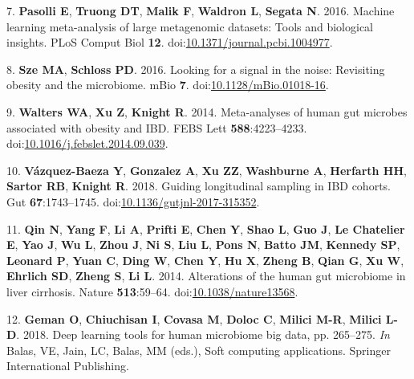 \documentclass[
  11pt,
]{article}
\begin{document}
\leavevmode\hypertarget{ref-pasolli_machine_2016}{}%
7. \textbf{Pasolli E}, \textbf{Truong DT}, \textbf{Malik F},
\textbf{Waldron L}, \textbf{Segata N}. 2016. Machine learning
meta-analysis of large metagenomic datasets: Tools and biological
insights. PLoS Comput Biol \textbf{12}.
doi:\href{https://doi.org/10.1371/journal.pcbi.1004977}{10.1371/journal.pcbi.1004977}.

\leavevmode\hypertarget{ref-sze_looking_2016}{}%
8. \textbf{Sze MA}, \textbf{Schloss PD}. 2016. Looking for a signal in
the noise: Revisiting obesity and the microbiome. mBio \textbf{7}.
doi:\href{https://doi.org/10.1128/mBio.01018-16}{10.1128/mBio.01018-16}.

\leavevmode\hypertarget{ref-walters_meta-analyses_2014}{}%
9. \textbf{Walters WA}, \textbf{Xu Z}, \textbf{Knight R}. 2014.
Meta-analyses of human gut microbes associated with obesity and IBD.
FEBS Lett \textbf{588}:4223--4233.
doi:\href{https://doi.org/10.1016/j.febslet.2014.09.039}{10.1016/j.febslet.2014.09.039}.

\leavevmode\hypertarget{ref-vazquez-baeza_guiding_2018}{}%
10. \textbf{Vázquez-Baeza Y}, \textbf{Gonzalez A}, \textbf{Xu ZZ},
\textbf{Washburne A}, \textbf{Herfarth HH}, \textbf{Sartor RB},
\textbf{Knight R}. 2018. Guiding longitudinal sampling in IBD cohorts.
Gut \textbf{67}:1743--1745.
doi:\href{https://doi.org/10.1136/gutjnl-2017-315352}{10.1136/gutjnl-2017-315352}.

\leavevmode\hypertarget{ref-qin_alterations_2014}{}%
11. \textbf{Qin N}, \textbf{Yang F}, \textbf{Li A}, \textbf{Prifti E},
\textbf{Chen Y}, \textbf{Shao L}, \textbf{Guo J}, \textbf{Le Chatelier
E}, \textbf{Yao J}, \textbf{Wu L}, \textbf{Zhou J}, \textbf{Ni S},
\textbf{Liu L}, \textbf{Pons N}, \textbf{Batto JM}, \textbf{Kennedy SP},
\textbf{Leonard P}, \textbf{Yuan C}, \textbf{Ding W}, \textbf{Chen Y},
\textbf{Hu X}, \textbf{Zheng B}, \textbf{Qian G}, \textbf{Xu W},
\textbf{Ehrlich SD}, \textbf{Zheng S}, \textbf{Li L}. 2014. Alterations
of the human gut microbiome in liver cirrhosis. Nature
\textbf{513}:59--64.
doi:\href{https://doi.org/10.1038/nature13568}{10.1038/nature13568}.

\leavevmode\hypertarget{ref-geman_deep_2018}{}%
12. \textbf{Geman O}, \textbf{Chiuchisan I}, \textbf{Covasa M},
\textbf{Doloc C}, \textbf{Milici M-R}, \textbf{Milici L-D}. 2018. Deep
learning tools for human microbiome big data, pp. 265--275. \emph{In}
Balas, VE, Jain, LC, Balas, MM (eds.), Soft computing applications.
Springer International Publishing.
\end{document}
